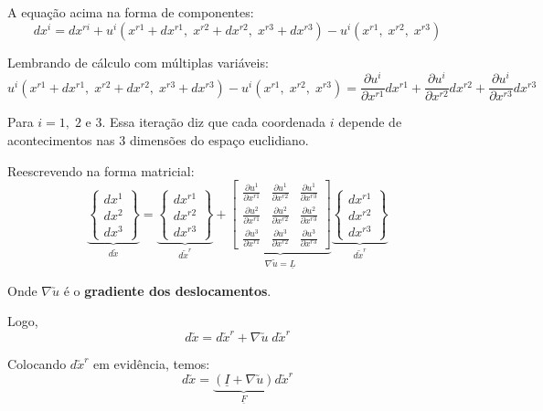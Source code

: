 \documentclass[12pt, a4paper]{article}
\begin{document}
	A equação acima na forma de componentes:
	\[dx^i=dx^{ri}+u^i(x^{r1}+dx^{r1},\;x^{r2}+dx^{r2},\;x^{r3}+dx^{r3})-u^i(x^{r1},\;x^{r2},\;x^{r3})\]
	
	Lembrando de cálculo com múltiplas variáveis:
	\[u^i(x^{r1}+dx^{r1},\;x^{r2}+dx^{r2},\;x^{r3}+dx^{r3})-u^i(x^{r1},\;x^{r2},\;x^{r3})=\frac{\partial u^i}{\partial x^{r1}}dx^{r1}+\frac{\partial u^i}{\partial x^{r2}}dx^{r2}+\frac{\partial u^i}{\partial x^{r3}}dx^{r3}\]
	
	Para $i=1,\;2$ e $3$. Essa iteração diz que cada coordenada $i$ depende de acontecimentos nas $3$ dimensões do espaço euclidiano.
	
	Reescrevendo na forma matricial:
	\[
	\underbrace{
		\begin{Bmatrix}
			dx^1 \\ dx^2 \\ dx^3
		\end{Bmatrix}
		}_{\displaystyle d\utilde{x}}
		=
		\underbrace{
		\begin{Bmatrix}
			dx^{r1} \\ dx^{r2} \\ dx^{r3}
		\end{Bmatrix}
		}_{\displaystyle d\utilde{x}^r}
		+
		\underbrace{
		\begin{bmatrix}
			\frac{\partial u^1}{\partial x^{r1}} & \frac{\partial u^1}{\partial x^{r2}} & \frac{\partial u^1}{\partial x^{r3}} \\
			\frac{\partial u^2}{\partial x^{r1}} & \frac{\partial u^2}{\partial x^{r2}} & \frac{\partial u^2}{\partial x^{r3}} \\
			\frac{\partial u^3}{\partial x^{r1}} & \frac{\partial u^3}{\partial x^{r2}} & \frac{\partial u^3}{\partial x^{r3}}
		\end{bmatrix}
		}_{\displaystyle\nabla\utilde{u}=\underline{L}}
		\underbrace{
		\begin{Bmatrix}
			dx^{r1} \\ dx^{r2} \\ dx^{r3}
		\end{Bmatrix}
		}_{\displaystyle d\utilde{x}^r}
	\]
	
	Onde $\nabla\utilde{u}$ é o \textbf{gradiente dos deslocamentos}.
	
	Logo,
	\[d\utilde{x}=d\utilde{x}^r+\nabla\utilde{u}\;d\utilde{x}^r\]
	
	Colocando $d\utilde{x}^r$ em evidência, temos:
	\[d\utilde{x}=\underbrace{(\underline{I}+\nabla\utilde{u})}_{\displaystyle \underline{F}}d\utilde{x}^r\]
	
\end{document}

